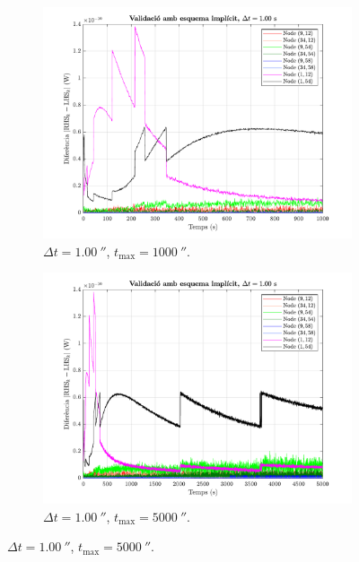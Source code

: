 \begin{figure}[ht]
\begin{subfigure}{.5\textwidth}
	\end{subfigure}
	\begin{subfigure}{.5\textwidth}
		\centering
		\includegraphics[width=.95\linewidth]{imagenes/03_validacio/validacio_09.pdf}
		\vspace{-7pt}
		\caption{$\Delta t = 1.00 \ \second$, $t_\text{max} = 1000 \ \second$.}
		\label{fig:validacio_09}
	\end{subfigure}%
	\begin{subfigure}{.5\textwidth}
		\centering
		\includegraphics[width=.95\linewidth]{imagenes/03_validacio/validacio_10.pdf}
		\vspace{-7pt}
		\caption{$\Delta t = 1.00 \ \second$, $t_\text{max} = 5000 \ \second$.}

\end{subfigure}
\end{figure}
